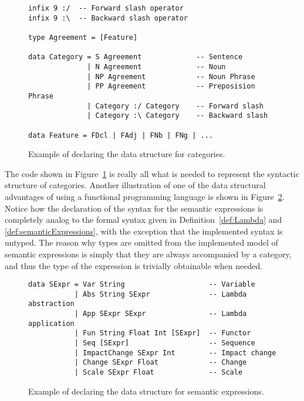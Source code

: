 \begin{figure}[ht]
\begin{cframed}{.9\textwidth}
\vspace{-8pt}
\begin{lstlisting}[language=GHC]
infix 9 :/  -- Forward slash operator
infix 9 :\  -- Backward slash operator

type Agreement = [Feature]

data Category = S Agreement             -- Sentence
              | N Agreement             -- Noun
              | NP Agreement            -- Noun Phrase
              | PP Agreement            -- Preposision Phrase
              | Category :/ Category    -- Forward slash
              | Category :\ Category    -- Backward slash

data Feature = FDcl | FAdj | FNb | FNg | ...
\end{lstlisting}	
\end{cframed}
\caption{Example of declaring the data structure for categories.}
\label{fig:categoryDataType}
\end{figure}

The code shown in Figure~\ref{fig:categoryDataType} is really all what is needed to represent the syntactic structure of categories. Another illustration of one of the data structural advantages of using a functional programming language is shown in Figure~\ref{fig:lambdaDataType}. Notice how the declaration of the syntax for the semantic expressions is completely analog to the formal syntax given in Definition~\ref{def:Lambda} and \ref{def:semanticExpressions}, with the exception that the implemented syntax is untyped. The reason why types are omitted from the implemented model of semantic expressions is simply that they are always accompanied by a category, and thus the type of the expression is trivially obtainable when needed.

\begin{figure}[ht]
\begin{cframed}{.9\textwidth}
\vspace{-8pt}
\begin{lstlisting}[language=GHC]
data SExpr = Var String                    -- Variable
           | Abs String SExpr              -- Lambda abstraction
           | App SExpr SExpr               -- Lambda application
           | Fun String Float Int [SExpr]  -- Functor
           | Seq [SExpr]                   -- Sequence
           | ImpactChange SExpr Int        -- Impact change
           | Change SExpr Float            -- Change
           | Scale SExpr Float             -- Scale
\end{lstlisting}	
\end{cframed}
\caption{Example of declaring the data structure for semantic expressions.}
\label{fig:lambdaDataType}
\end{figure}

